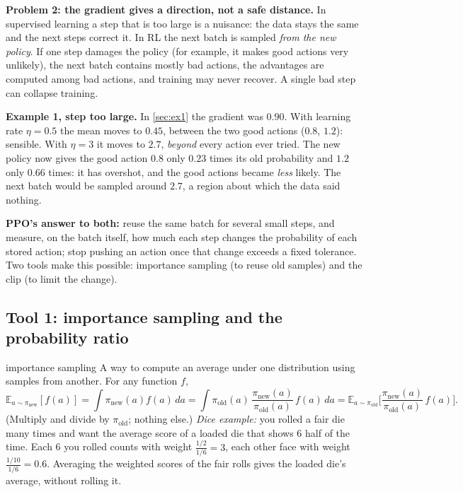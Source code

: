 \documentclass[11pt,a4paper]{article}
\newcommand{\E}{\mathbb{E}}
\begin{document}
\textbf{Problem 2: the gradient gives a direction, not a safe distance.} In supervised learning a step that is too large is a nuisance: the data stays the same and the next steps correct it. In RL the next batch is sampled \emph{from the new policy}. If one step damages the policy (for example, it makes good actions very unlikely), the next batch contains mostly bad actions, the advantages are computed among bad actions, and training may never recover. A single bad step can collapse training.

\textbf{Example 1, step too large.} In \cref{sec:ex1} the gradient was $0.90$. With learning rate $\eta=0.5$ the mean moves to $0.45$, between the two good actions ($0.8$, $1.2$): sensible. With $\eta=3$ it moves to $2.7$, \emph{beyond} every action ever tried. The new policy now gives the good action $0.8$ only $0.23$ times its old probability and $1.2$ only $0.66$ times: it has overshot, and the good actions became \emph{less} likely. The next batch would be sampled around $2.7$, a region about which the data said nothing.

\textbf{PPO's answer to both:} reuse the same batch for several small steps, and measure, on the batch itself, how much each step changes the probability of each stored action; stop pushing an action once that change exceeds a fixed tolerance. Two tools make this possible: importance sampling (to reuse old samples) and the clip (to limit the change).

\subsection{Tool 1: importance sampling and the probability ratio}
\begin{newc}{importance sampling}
A way to compute an average under one distribution using samples from another. For any function $f$,
\[
\E_{a\sim\pi_{\mathrm{new}}}[f(a)]=\int\pi_{\mathrm{new}}(a)f(a)\,da=\int\pi_{\mathrm{old}}(a)\,\frac{\pi_{\mathrm{new}}(a)}{\pi_{\mathrm{old}}(a)}\,f(a)\,da=\E_{a\sim\pi_{\mathrm{old}}}\Big[\frac{\pi_{\mathrm{new}}(a)}{\pi_{\mathrm{old}}(a)}\,f(a)\Big].
\]
(Multiply and divide by $\pi_{\mathrm{old}}$; nothing else.) \emph{Dice example:} you rolled a fair die many times and want the average score of a loaded die that shows 6 half of the time. Each 6 you rolled counts with weight $\frac{1/2}{1/6}=3$, each other face with weight $\frac{1/10}{1/6}=0.6$. Averaging the weighted scores of the fair rolls gives the loaded die's average, without rolling it.
\end{newc}
\end{document}
